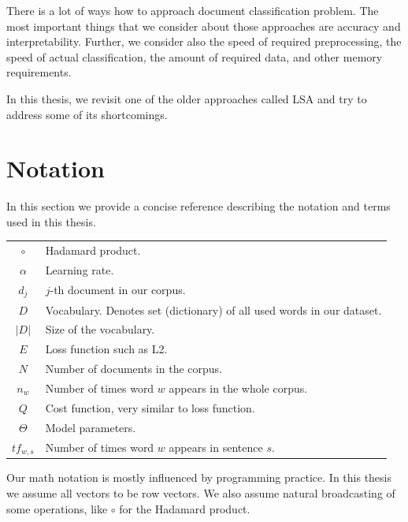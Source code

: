     There is a lot of ways how to approach document classification problem. 
    The most important things that we consider about those approaches are accuracy and interpretability.
    Further, we consider also the speed of required preprocessing, the speed of actual classification, the amount of required data, and other memory requirements. 
    
    In this thesis, we revisit one of the older approaches called LSA and try to address some of its shortcomings.
    

\section{Notation}

    In this section we provide a concise reference describing the notation and terms used in this thesis.
    
    \begin{table}[h]
        \centering
        \begin{tabular}{c l}
            $\circ$ & Hadamard product. \\
            $\alpha$ & Learning rate. \\
            $d_j$ & $j$-th document in our corpus.\\
            $D$ & Vocabulary. Denotes set (dictionary) of all used words in our dataset. \\
            $|D|$ & Size of the vocabulary. \\
            $E$ & Loss function such as L2.\\
            $N$ & Number of documents in the corpus. \\
            $n_w$ & Number of times word $w$ appears in the whole corpus. \\
            $Q$ & Cost function, very similar to loss function.\\
            $\Theta$ & Model parameters.\\
            $tf_{w,s}$ & Number of times word $w$ appears in sentence $s$. \\
            
        \end{tabular}
    \end{table}
    
    Our math notation is mostly influenced by programming practice.
    In this thesis we assume all vectors to be row vectors.
    We also assume natural broadcasting of some operations, like $\circ$ for the Hadamard product.
    
